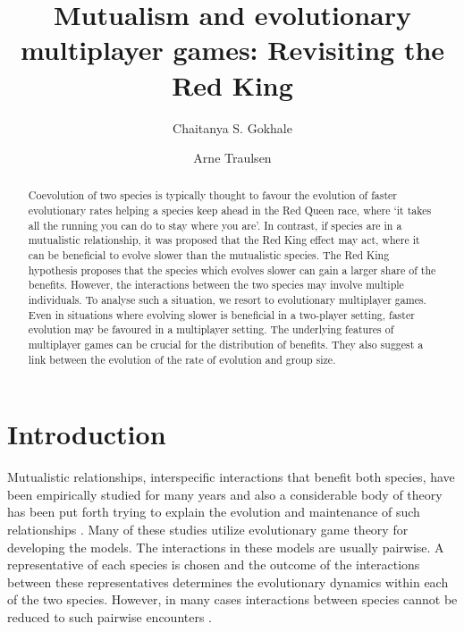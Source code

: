 \documentclass[aps,pre,amsfonts,floatfix, onecolumn,showkeys]{revtex4-1}
\begin{document}
\title{
Mutualism and evolutionary multiplayer games: Revisiting the Red King
}

\author{Chaitanya S. Gokhale}
\author{Arne Traulsen}%
%

\begin{abstract}
Coevolution of two species is typically thought to favour the evolution of faster evolutionary rates helping a species keep ahead in the Red Queen race,
where `it takes all the running you can do to stay where you are'.
In contrast, if species are in a mutualistic relationship, it was proposed that the Red King effect may act, where it can be beneficial to evolve slower than the mutualistic species.
The Red King hypothesis proposes that the species which evolves slower can gain a larger share of the benefits.
However, the interactions between the two species may involve multiple individuals.
To analyse such a situation, we resort to 
evolutionary multiplayer games. 
Even in situations where evolving slower is beneficial in a two-player setting,
faster evolution may be favoured in a multiplayer setting.
The underlying features of multiplayer games can be crucial for the distribution of benefits.
They also suggest a link between the evolution of the rate of evolution and group size.
\end{abstract}


\maketitle



\section{Introduction}

Mutualistic relationships, interspecific interactions that benefit both species, have been empirically studied for many years \cite{boucher:book:1985,hinton:PTENHS:1951,wilson:AmNat:1983,bronstein:QRB:1994,pierce:ARE:2002,kiers:Nature:2003,bshary:book:2003} and also a considerable body of theory has been put forth trying to explain the evolution and maintenance of such relationships \cite{poulin:JTB:1995,doebeli:PNAS:1998,noe:book:2001,johnstone:ECL:2002,bergstrom:PNAS:2003,hoeksema:AmNat:2003,akcay:PRSB:2007,bshary:Nature:2008}.
Many of these studies utilize evolutionary game theory for developing the models.
The interactions in these models are usually pairwise.
A representative of each species is chosen and the outcome of the interactions between these representatives 
determines the evolutionary dynamics within each of the two species.
However, in many cases interactions between species cannot be reduced to such pairwise encounters \cite{stadler:book:2008}.
\end{document}
